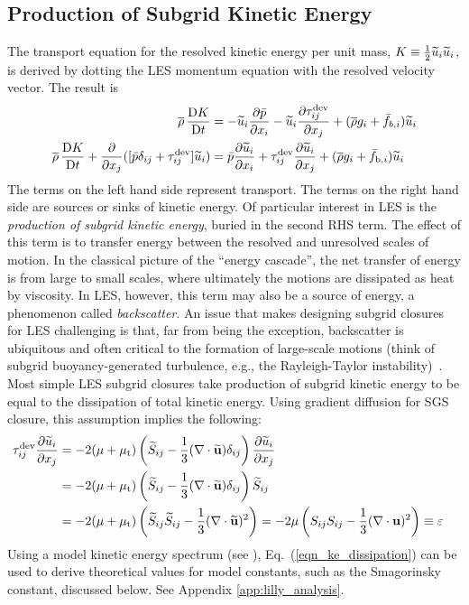 \subsection{Production of Subgrid Kinetic Energy}

The transport equation for the resolved kinetic energy per unit mass, $K\equiv \mbox{$\frac{1}{2}$} \widetilde{u}_i\widetilde{u}_i$, is derived by dotting the LES momentum equation with the resolved velocity vector.  The result is
\begin{align}
\label{eqn_LES_KE}
\overline{\rho} \,\frac{\mathrm{D} K}{\mathrm{D} t} &= -\widetilde{u}_i\frac{\partial \bar{p}}{\partial x_i} - \widetilde{u}_i\frac{\partial \tau_{ij}^{\rm dev}}{\partial x_j} + (\overline{\rho} g_i + \bar{f}_{b,i}) \widetilde{u}_i \notag \\
\overline{\rho} \,\frac{\mathrm{D} K}{\mathrm{D} t} + \frac{\partial}{\partial x_j} ([\bar{p}\delta_{ij} + \tau_{ij}^{\rm dev}]\widetilde{u}_i) &=  \bar{p} \frac{\partial \widetilde{u}_i}{\partial x_i} + \tau_{ij}^{\rm dev}\frac{\partial \widetilde{u}_i}{\partial x_j} + (\overline{\rho} g_i + \bar{f}_{{\rm b},i}) \widetilde{u}_i
\end{align}
The terms on the left hand side represent transport.  The terms on the right hand side are sources or sinks of kinetic energy.  Of particular interest in LES is the \emph{production of subgrid kinetic energy}, buried in the second RHS term.  The effect of this term is to transfer energy between the resolved and unresolved scales of motion.  In the classical picture of the ``energy cascade'', the net transfer of energy is from large to small scales, where ultimately the motions are dissipated as heat by viscosity.  In LES, however, this term may also be a source of energy, a phenomenon called \emph{backscatter}.  An issue that makes designing subgrid closures for LES challenging is that, far from being the exception, backscatter is ubiquitous and often critical to the formation of large-scale motions (think of subgrid buoyancy-generated turbulence, e.g., the Rayleigh-Taylor instability)~\cite{Piomelli:1991}.
Most simple LES subgrid closures take production of subgrid kinetic energy to be equal to the dissipation of total kinetic energy.  Using gradient diffusion for SGS closure, this assumption implies the following:
\begin{align}
\label{eqn_ke_dissipation}
\tau_{ij}^{\rm dev}\frac{\partial \widetilde{u}_i}{\partial x_j} &= - 2 (\mu + \mu_{\rm t}) \left(\widetilde{S}_{ij} - \frac{1}{3}(\nabla\cdot \widetilde{\mathbf{u}}) \delta_{ij} \right) \frac{\partial \widetilde{u}_i}{\partial x_j} && \notag\\
&= - 2 (\mu + \mu_{\rm t}) \left(\widetilde{S}_{ij} - \frac{1}{3}(\nabla\cdot \widetilde{\mathbf{u}}) \delta_{ij} \right) \widetilde{S}_{ij} && \notag \\
&= - 2 (\mu + \mu_{\rm t}) \left(\widetilde{S}_{ij}\widetilde{S}_{ij} - \frac{1}{3}(\nabla\cdot \widetilde{\mathbf{u}})^2 \right) = -2\mu \left(S_{ij}S_{ij} - \frac{1}{3}(\nabla\cdot \mathbf{u})^2 \right) \equiv \varepsilon
\end{align}
Using a model kinetic energy spectrum (see \cite{Pope:2000}), Eq.~(\ref{eqn_ke_dissipation}) can be used to derive theoretical values for model constants, such as the Smagorinsky constant, discussed below.  See Appendix \ref{app:lilly_analysis}.



